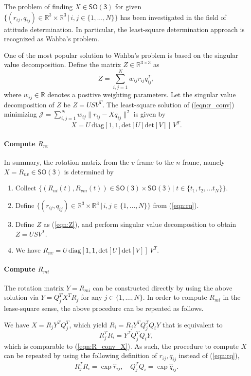 \documentclass[11pt]{article}
\newcommand{\SO}{\ensuremath{\mathsf{SO(3)}}}
\renewcommand{\Re}{\ensuremath{\mathbb{R}}}
\newcommand{\refeqn}[1]{(\ref{eqn:#1})}
\begin{document}
The problem of finding $X\in\SO$ for given $\{(r_{ij},q_{ij})\in\Re^3\times \Re^3\,|\,i,j\in\{1,\ldots,N\}\}$ has been investigated in the field of attitude determination. In particular, the least-square determination approach is recognized as Wahba's problem. 

One of the most popular solution to Wahba's problem is based on the singular value decomposition. Define the matrix $Z\in\Re^{3\times 3}$ as
\begin{equation}\label{eqn:Z}
Z=\sum_{i,j=1}^N w_{ij} r_{ij}q_{ij}^T,
\end{equation}
where $w_{ij}\in\Re$ denotes a positive weighting parameters. Let the singular value decomposition of $Z$ be $Z=USV^T$. The least-square solution of \refeqn{r_conv} minimizing $\mathcal{J} = \sum_{i,j=1}^N w_{ij}\|r_{ij} - X q_{ij}\|^2$ is given by
\begin{equation}
X = U\,\mathrm{diag}[1,1,\mathrm{det}[U]\mathrm{det}[V]]\, V^T.
\end{equation}

\paragraph{Compute $R_{nv}$} In summary, the rotation matrix from the $v$-frame to the $n$-frame, namely $X=R_{nv}\in\SO$ is determined by
\begin{enumerate}
\item Collect $\{(R_{ni}(t),R_{vm}(t))\in\SO\times\SO\,|\, t\in\{t_1,t_2,\ldots t_N\}\}$.
\item Define $\{(r_{ij},q_{ij})\in\Re^3\times \Re^3\,|\,i,j\in\{1,\ldots,N\}\}$ from \refeqn{rq}.
\item Define $Z$ as \refeqn{Z}, and perform singular value decomposition to obtain $Z=USV^T$.
\item We have 
$R_{nv}= U\,\mathrm{diag}[1,1,\mathrm{det}[U]\mathrm{det}[V]]\, V^T$.
\end{enumerate}

\paragraph{Compute $R_{mi}$} The rotation matrix $Y=R_{mi}$ can be constructed directly by using the above solution via $Y= Q_j^T X^T R_j$ for any $j\in\{1,\ldots,N\}$. In order to compute $R_{mi}$ in the lease-square sense, the above procedure can be repeated as follows. 

We have $X=R_jY^T Q_j^T$, which yield $R_i = R_jY^T Q_j^T Q_i Y$ that is equivalent to
\[
R_j^TR_i = Y^T Q_j^T Q_i Y,
\]
which is comparable to \refeqn{R_conv_X}. As such, the procedure to compute $X$ can be repeated by using the following definition of $r_{ij},q_{ij}$ instead of \refeqn{rq},
\begin{equation}\label{eqn:rq_Y}
R_j^T R_i = \exp\hat r_{ij},\quad Q_j^TQ_i = \exp \hat q_{ij}.
\end{equation}
\end{document}
